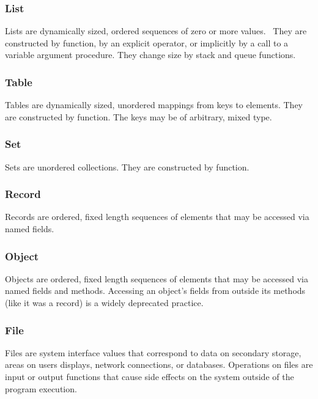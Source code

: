 \subsubsection{List}

Lists are dynamically sized, ordered sequences of zero or
more values. \ They are constructed by function, by an explicit
operator, or implicitly by a call to a variable argument procedure.
They change size by stack and queue
functions.

\subsubsection{Table}

Tables are dynamically sized, unordered mappings from keys
to elements. They are constructed by function. The keys may be of
arbitrary, mixed type.

\subsubsection{Set}

Sets are unordered collections. They are constructed by
function.

\subsubsection{Record}

Records are ordered, fixed length sequences of elements
that may be accessed via named fields.

\subsubsection{Object}

Objects are ordered, fixed length sequences of elements
that may be accessed via named fields and methods. Accessing an object's
fields from outside its methods (like it was a record)
is a widely deprecated practice.

\subsubsection[File]{File}

Files are system interface values that correspond to data on
secondary storage, areas on users{\textquotesingle} displays, network
connections, or databases. Operations on files are
input or output functions that cause side effects on the system outside
of the program execution.

